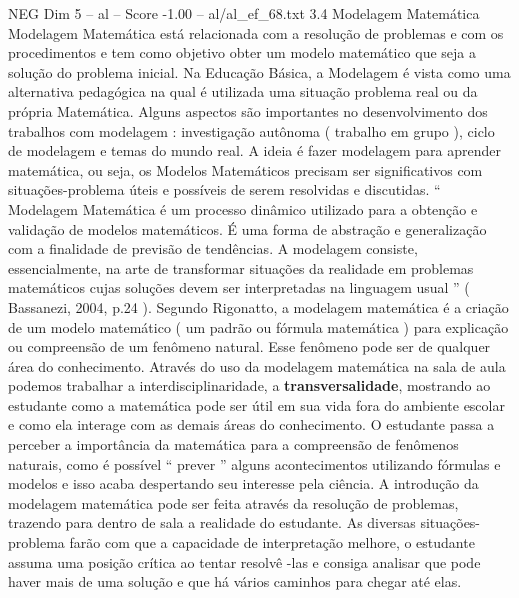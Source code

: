 \begin{textsample}{NEG Dim 5 – al – Score -1.00 – al/al\_ef\_68.txt}  \label{ex:f5_neg_243}
3.4 Modelagem Matemática Modelagem Matemática está relacionada com a resolução de problemas e com os procedimentos e tem como objetivo obter um modelo matemático que seja a solução do problema inicial.
Na Educação Básica, a Modelagem é vista como uma alternativa pedagógica na qual é utilizada uma situação problema real ou da própria Matemática.
Alguns aspectos são importantes no desenvolvimento dos trabalhos com modelagem : investigação autônoma ( trabalho em grupo ), ciclo de modelagem e temas do mundo real.
A ideia é fazer modelagem para aprender matemática, ou seja, os Modelos Matemáticos precisam ser significativos com situações-problema úteis e possíveis de serem resolvidas e discutidas. “ Modelagem Matemática é um processo dinâmico utilizado para a obtenção e validação de modelos matemáticos.
É uma forma de abstração e generalização com a finalidade de previsão de tendências.
A modelagem consiste, essencialmente, na arte de transformar situações da realidade em problemas matemáticos cujas soluções devem ser interpretadas na linguagem usual ” ( Bassanezi, 2004, p.24 ).
Segundo Rigonatto, a modelagem matemática é a criação de um modelo matemático ( um padrão ou fórmula matemática ) para explicação ou compreensão de um fenômeno natural.
Esse fenômeno pode ser de qualquer área do conhecimento.
Através do uso da modelagem matemática na sala de aula podemos trabalhar a interdisciplinaridade, a \textbf{transversalidade}, mostrando ao estudante como a matemática pode ser útil em sua vida fora do ambiente escolar e como ela interage com as demais áreas do conhecimento.
O estudante passa a perceber a importância da matemática para a compreensão de fenômenos naturais, como é possível “ prever ” alguns acontecimentos utilizando fórmulas e modelos e isso acaba despertando seu interesse pela ciência.
A introdução da modelagem matemática pode ser feita através da resolução de problemas, trazendo para dentro de sala a realidade do estudante.
As diversas situações-problema farão com que a capacidade de interpretação melhore, o estudante assuma uma posição crítica ao tentar resolvê -las e consiga analisar que pode haver mais de uma solução e que há vários caminhos para chegar até elas.

\end{textsample}
